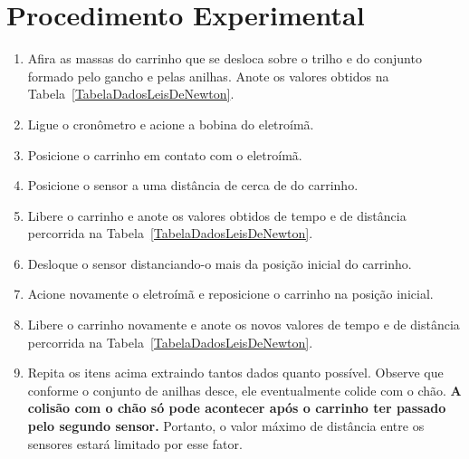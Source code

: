 \section{Procedimento Experimental}

\begin{enumerate}
	\item Afira as massas do carrinho que se desloca sobre o trilho e do conjunto formado pelo gancho e pelas anilhas. Anote os valores obtidos na Tabela~\ref{TabelaDadosLeisDeNewton}.
	\item Ligue o cronômetro e acione a bobina do eletroímã.
	\item Posicione o carrinho em contato com o eletroímã.
	\item Posicione o sensor a uma distância de cerca de  do carrinho.
	\item Libere o carrinho e anote os valores obtidos de tempo e de distância percorrida na Tabela~\ref{TabelaDadosLeisDeNewton}.
	\item Desloque o sensor distanciando-o mais  da posição inicial do carrinho.
	\item Acione novamente o eletroímã e reposicione o carrinho na posição inicial. 
	\item Libere o carrinho novamente e anote os novos valores de tempo e de distância percorrida na Tabela~\ref{TabelaDadosLeisDeNewton}.
	\item Repita os itens acima extraindo tantos dados quanto possível. Observe que conforme o conjunto de anilhas desce, ele eventualmente colide com o chão. \textbf{A colisão com o chão só pode acontecer após o carrinho ter passado pelo segundo sensor.} Portanto, o valor máximo de distância entre os sensores estará limitado por esse fator. 
\end{enumerate}

\cleardoublepage


\vspace{15mm}

